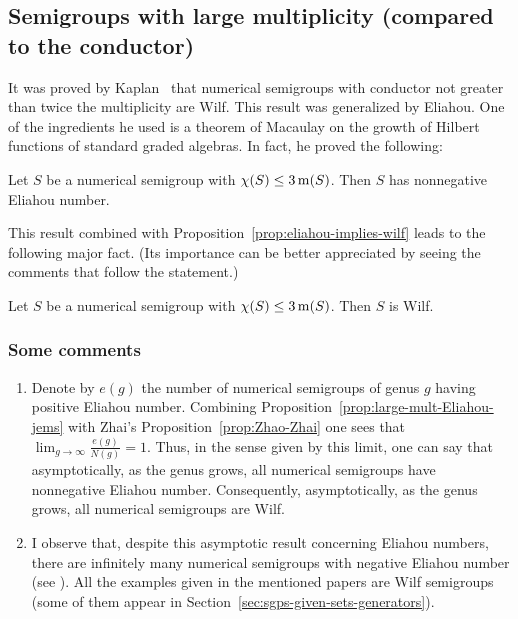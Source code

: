 \subsection{Semigroups with large multiplicity (compared to the conductor)}\label{sec:large-mult}
It was proved by Kaplan~\cite[Th.~24]{Kaplan2012JPAA-Counting} that numerical semigroups with conductor not greater than twice the multiplicity are Wilf. This result was generalized by Eliahou. One of the ingredients he used is a theorem of Macaulay on the growth of Hilbert functions of standard graded algebras.
In fact, he proved the following:

\begin{proposition}\label{prop:large-mult-Eliahou-jems}
	Let $S$ be a numerical semigroup with $\operatorname{\chi}(S)\le 3\operatorname{m}(S)$. Then $S$ has nonnegative Eliahou number.
\end{proposition}
This result combined with Proposition~\ref{prop:eliahou-implies-wilf} leads to the following major fact. (Its importance can be better appreciated by seeing the comments that follow the statement.)

\begin{theorem}\label{th:large-mult-Wilf-jems}
  Let $S$ be a numerical semigroup with $\operatorname{\chi}(S)\le 3\operatorname{m}(S)$. Then $S$ is Wilf.
\end{theorem}
\subsubsection*{Some comments}
\begin{enumerate}
	\item Denote by $e(g)$ the number of numerical semigroups of genus $g$ having positive Eliahou number. Combining Proposition~\ref{prop:large-mult-Eliahou-jems} with Zhai's Proposition~\ref{prop:Zhao-Zhai}  one sees that $\lim_{g\to\infty} \frac{e(g)}{N(g)}=1.$ Thus, in the sense given by this limit, one can say that asymptotically, as the genus grows, all numerical semigroups have nonnegative Eliahou number. Consequently, asymptotically, as the genus grows, all numerical semigroups are Wilf.
    \item I observe that, despite this asymptotic result concerning Eliahou numbers, there are infinitely many numerical semigroups with negative Eliahou number (see \cite{Delgado2018MZ-question,EliahouFromentin2018SF-misses}). All the examples given in the mentioned papers are Wilf semigroups (some of them appear in Section~\ref{sec:sgps-given-sets-generators}).
\end{enumerate}

